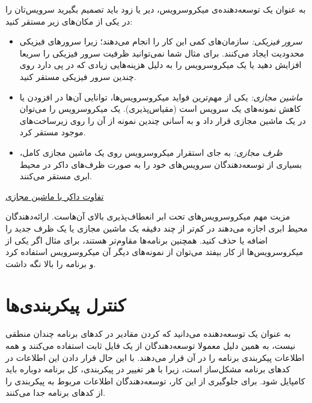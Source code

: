 \documentclass[a4paper,12pt]{book}
\begin{document}
	به عنوان یک توسعه‌دهنده‌ی میکروسرویس، دیر یا زود باید تصمیم بگیرید سرویس‌تان را در یکی از مکان‌های زیر مستقر کنید:
	\begin{itemize}[label=$\ast$]
		\item \textit{سرور فیزیکی:} 
		سازمان‌های کمی این کار را انجام می‌دهند؛ زیرا سرورهای فیزیکی محدودیت ایجاد می‌کنند. برای مثال شما نمی‌توانید ظرفیت سرور فیزیکی را سریعا افزایش دهید یا یک میکروسرویس را به دلیل هزینه‌هایی زیادی که در پی دارد روی چندین سرور فیزیکی مستقر کنید.
		
		
		\item \textit{ماشین مجازی:}
		یکی از مهم‌ترین فواید میکروسرویس‌ها، توانایی آن‌ها در افزودن یا کاهش نمونه‌های یک سرویس است (مقیاس‌پذیری). یک میکروسرویس  را می‌توان در یک ماشین مجازی قرار داد و به آسانی چندین نمونه از آن را روی زیرساخت‌های موجود مستقر کرد.
		
		\item \textit{ظرف مجازی:} 
		به جای استقرار میکروسرویس ‌روی یک ماشین مجازی کامل، بسیاری از توسعه‌دهندگان سرویس‌های خود را به صورت ظرف‌های داکر
		در محیط ابری مستقر می‌کنند. 
	\end{itemize}
	
	
	\begin{tcolorbox}[colback=yellow!10!white,colframe=red!75!black,title=مطالعه‌ی بیشتر]
		
		\href{https://nickjanetakis.com/blog/comparing-virtual-machines-vs-docker-containers}
		{ تفاوت داکر با ماشین مجازی}
	\end{tcolorbox}
	
	\vskip 0.5cm
	مزیت مهم میکروسرویس‌های تحت ابر انعطاف‌پذیری بالای آن‌هاست. ارائه‌دهندگان محیط ابری اجازه می‌دهند در کم‌تر از چند دقیقه یک ماشین مجازی یا یک ظرف جدید را اضافه یا حذف کنید. همچنین برنامه‌ها مقاوم‌تر هستند، برای مثال اگر یکی از میکروسرویس‌ها از کار بیفتد می‌توان از نمونه‌های دیگر آن میکروسرویس استفاده کرد و برنامه را بالا نگه داشت. 
	
	
	
	
	
	
	
	
	
	
	
	\chapter{کنترل پیکربندی‌ها}
	به عنوان یک توسعه‌دهنده می‌دانید که
	کردن مقادیر در کدهای برنامه چندان منطقی نیست، به همین دلیل معمولا توسعه‌دهندگان از یک فایل ثابت استفاده می‌کنند و همه اطلاعات پیکربندی برنامه را در آن قرار می‌دهند. با این حال قرار دادن این اطلاعات در کدهای برنامه مشکل‌ساز است، زیرا با هر تغییر در پیکربندی، کل برنامه دوباره باید کامپایل شود. برای جلوگیری از این کار، توسعه‌دهندگان اطلاعات مربوط به پیکربندی را از کدهای برنامه جدا می‌کنند. 
	
\end{document}
